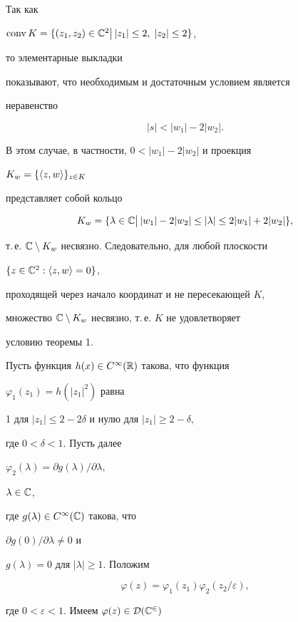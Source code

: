 Так как 


$\operatorname{conv} K=\{(z_1,z_2)\in\Bbb C^2\bigl|\,\bigr.|z_1|\le 2,\;|z_2|\le 2\}$, 


то элементарные выкладки 


показывают, что необходимым и достаточным условием является 


неравенство 


\begin{equation} 


|s| < |w_1|-2|w_2|. 


\end{equation} 


В этом случае, в частности, $0<|w_1|-2|w_2|$ и проекция 


$K_w=\{\langle z,w\rangle\}_{z\in K}$ 


представляет собой кольцо 


$$ 


K_w=\{\lambda\in\Bbb C\bigl|\,\bigr. 


|w_1|-2|w_2|\le|\lambda|\le 2|w_1|+2|w_2|\}, 


$$ 


т.\,е. $\Bbb C\setminus K_w$ несвязно. Следовательно, для любой плоскости 


$\{z\in\Bbb C^2:\langle z,w\rangle=0\}$, 


проходящей через начало координат и не пересекающей $K$, 


множество $\Bbb C\setminus K_w$ несвязно, т.\,е. $K$ не удовлетворяет 


условию теоремы 1. 


Пусть функция $h(x)\in C^\infty(\Bbb R)$ такова, что функция 


$\varphi_1(z_1)=h(|z_1|^2)$ равна 


1 для $|z_1|\le 2-2\delta$ и нулю для $|z_1|\ge 2-\delta$, 


где $0<\delta<1$. Пусть далее 


$\varphi_2(\lambda)=\partial g(\lambda)/\partial\lambda$, 


$\lambda\in\Bbb C$, 


где $g(\lambda)\in C^\infty(\Bbb C)$ такова, что 


$\partial g(0)/\partial\lambda\ne 0$ и 


$g(\lambda)=0$ для $|\lambda|\ge 1$. Положим 


$$ 


\varphi(z)=\varphi_1(z_1)\varphi_2(z_2/\varepsilon), 


$$ 


где $0<\varepsilon<1$. Имеем $\varphi(z)\in\cal D(\Bbb C^2)$ 


